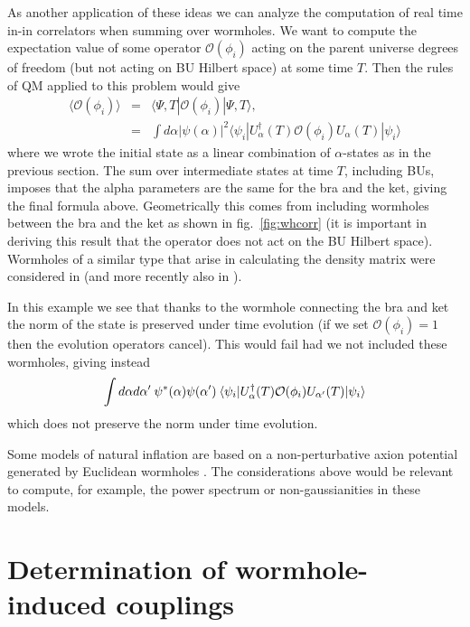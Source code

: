 \documentclass[12pt]{article}
\numberwithin{equation}{section}
\newcommand{\beq}{\begin{equation}}
\newcommand{\eeq}{\end{equation}}
\begin{document}
As another application of these ideas we can analyze the computation of real time in-in correlators when summing over wormholes. We want to compute the expectation value of some operator $\mathcal{O}(\phi_i)$ acting on the parent universe degrees of freedom (but not acting on BU Hilbert space) at some time $T$. Then the rules of QM applied to this problem would give 
\begin{eqnarray}
\langle \mathcal{O}(\phi_i)\rangle &=& \langle \Psi, T | \mathcal{O}(\phi_i) | \Psi, T\rangle, \nonumber\\
&=& \int d\alpha |\psi(\alpha)|^2 \langle \psi_i | U_\alpha^\dagger(T) \mathcal{O}(\phi_i) U_\alpha(T) | \psi_i \rangle
\end{eqnarray} 
where we wrote the initial state as a linear combination of $\alpha$-states as in the previous section. The sum over intermediate states at time $T$, including BUs, imposes that the alpha parameters are  the same for the bra and the ket, giving the final formula above. Geometrically this comes from including wormholes between the bra and the ket as shown in fig.~\ref{fig:whcorr} (it is important in deriving this result that the operator does not act on the BU Hilbert space). Wormholes of a similar type that arise in calculating the density matrix were considered in \cite{Page:1986vw} (and more recently also in \cite{Maldacena:2019cbz}). 

In this example we see that thanks to the wormhole connecting the bra and ket the norm of the state is preserved under time evolution (if we set $\mathcal{O}(\phi_i) = 1$ then the evolution operators cancel). This would fail had we not included these wormholes, giving instead 
\beq
 \int d\alpha d\alpha' \hspace{0.08cm}\psi^*(\alpha)\psi(\alpha') \hspace{0.08cm} \langle \psi_i | U_\alpha^\dagger(T) \mathcal{O}(\phi_i) U_{\alpha'}(T) | \psi_i \rangle
\eeq
which does not preserve the norm under time evolution.

Some models of natural inflation are based on a non-perturbative axion potential generated by Euclidean wormholes \cite{Rey:1989mg, PhysRevLett.65.3233, Hebecker:2016dsw}. The considerations above would be relevant to compute, for example, the power spectrum or non-gaussianities in these models. 

\section{Determination of wormhole-induced couplings}
\end{document}
